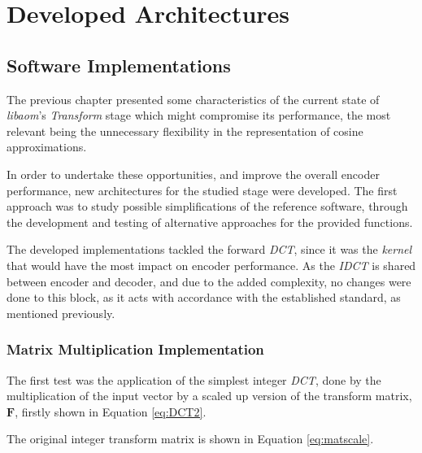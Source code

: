 \cleardoublepage
\chapter{Developed Architectures}

\section{Software Implementations}

The previous chapter presented some characteristics of the current state of \emph{libaom}'s \emph{Transform} stage which might compromise its performance, the most relevant being the unnecessary flexibility in the representation of cosine approximations.

In order to undertake these opportunities, and improve the overall encoder performance, new architectures for the studied stage were developed. The first approach was to study possible simplifications of the reference software, through the development and testing of alternative approaches for the provided functions.

The developed implementations tackled the forward \emph{DCT}, since it was the \emph{kernel} that would have the most impact on encoder performance. As the \emph{IDCT} is shared between encoder and decoder, and due to the added complexity, no changes were done to this block, as it acts with accordance with the established standard, as mentioned previously. 

\subsection{Matrix Multiplication Implementation}

The first test was the application of the simplest integer \emph{DCT}, done by the multiplication of the input vector by a scaled up version of the transform matrix, $\mathbf{F}$, firstly shown in Equation \ref{eq:DCT2}. 

The original integer transform matrix is shown in Equation \ref{eq:matscale}.

